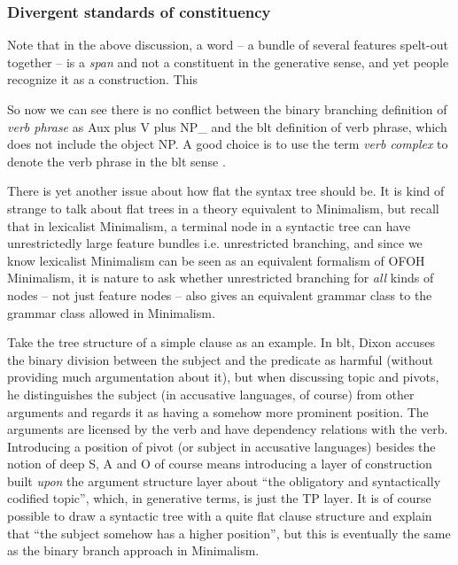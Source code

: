 \documentclass[../main.tex]{subfiles}
\begin{document}
\subsubsection{Divergent standards of constituency}

Note that in the above discussion, a word -- a bundle of several features spelt-out together -- 
is a \emph{span} and not a constituent in the generative sense, 
and yet people recognize it as a construction. 
This %

So now we can see there is no conflict 
between the binary branching definition of \emph{verb phrase} as Aux plus V plus NP_{} 
and the \ac{blt} definition of verb phrase, which does not include the object NP. 
A good choice is to use the term \emph{verb complex} to denote the verb phrase in the \ac{blt} sense \citep[among others]{Wilbur2014,Friesen2017}.

There is yet another issue about how flat the syntax tree should be. 
It is kind of strange to talk about flat trees in a theory equivalent to Minimalism, 
but recall that in lexicalist Minimalism, 
a terminal node in a syntactic tree can have unrestrictedly large feature bundles i.e. unrestricted branching, 
and since we know lexicalist Minimalism can be seen as an equivalent formalism of OFOH Minimalism, 
it is nature to ask whether unrestricted branching for \emph{all} kinds of nodes 
-- not just feature nodes -- also gives an equivalent grammar class to the grammar class allowed in Minimalism.

Take the tree structure of a simple clause as an example. 
In \ac{blt}, Dixon accuses the binary division between 
the subject and the predicate as harmful (without providing much argumentation about it), but when discussing 
topic and pivots, he distinguishes the subject (in accusative languages, of course) from other arguments and regards it as having a somehow more 
prominent position. The arguments are licensed by the verb and have dependency relations with the verb. 
Introducing a position of pivot (or subject in accusative languages) besides the notion of deep S, A and O 
of course means introducing a layer of construction built \emph{upon} the argument structure layer
about ``the obligatory and syntactically codified topic'', 
which, in generative terms, is just the TP layer. It is of course possible to draw a syntactic tree 
with a quite flat clause structure and explain that ``the subject somehow has a higher position'', 
but this is eventually the same as the binary branch approach in Minimalism.
\end{document}
